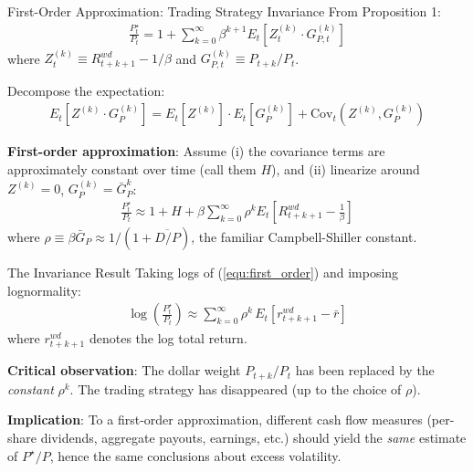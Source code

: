 \documentclass{beamer}
\begin{document}
\begin{frame}{First-Order Approximation: Trading Strategy Invariance}
	From Proposition 1:
	\begin{align*}
		\frac{P_t^\star}{P_t} = 1 + \sum_{k=0}^{\infty} \beta^{k+1} E_t\left[Z_t^{(k)} \cdot G_{P,t}^{(k)}\right]
	\end{align*}
	where $Z_t^{(k)} \equiv R_{t+k+1}^{wd} - 1/\beta$ and $G_{P,t}^{(k)} \equiv P_{t+k}/P_t$.

	\vspace{5pt}
	Decompose the expectation:
	\begin{align*}
		E_t[Z^{(k)} \cdot G_P^{(k)}] = E_t[Z^{(k)}] \cdot E_t[G_P^{(k)}] + \text{Cov}_t(Z^{(k)}, G_P^{(k)})
	\end{align*}

	\textbf{First-order approximation}: Assume (i) the covariance terms are approximately constant over time (call them $H$), and (ii) linearize around $Z^{(k)} = 0$, $G_P^{(k)} = \bar{G}_P^k$:
	\begin{align}
		\frac{P_t^\star}{P_t} \approx 1 + H + \beta \sum_{k=0}^{\infty} \rho^k E_t\left[R_{t+k+1}^{wd} - \frac{1}{\beta}\right] \label{equ:first_order}
	\end{align}
	where $\rho \equiv \beta \bar{G}_P \approx 1/(1 + \overline{D/P})$, the familiar Campbell-Shiller constant.
\end{frame}

\begin{frame}{The Invariance Result}
	Taking logs of (\ref{equ:first_order}) and imposing lognormality:
	\begin{align}
		\boxed{\log\left(\frac{P_t^\star}{P_t}\right) \approx \sum_{k=0}^{\infty} \rho^k \, E_t\left[r_{t+k+1}^{wd} - \bar{r}\right]} \label{equ:invariance}
	\end{align}
	where $r_{t+k+1}^{wd}$ denotes the log total return.

	\vspace{5pt}
	\textbf{Critical observation}: The dollar weight $P_{t+k}/P_t$ has been replaced by the \textit{constant} $\rho^k$. The trading strategy has disappeared (up to the choice of $\rho$).

	\vspace{5pt}
	\textbf{Implication}: To a first-order approximation, different cash flow measures (per-share dividends, aggregate payouts, earnings, etc.) should yield the \textit{same} estimate of $P^\star/P$, hence the same conclusions about excess volatility.
\end{frame}
\end{document}
